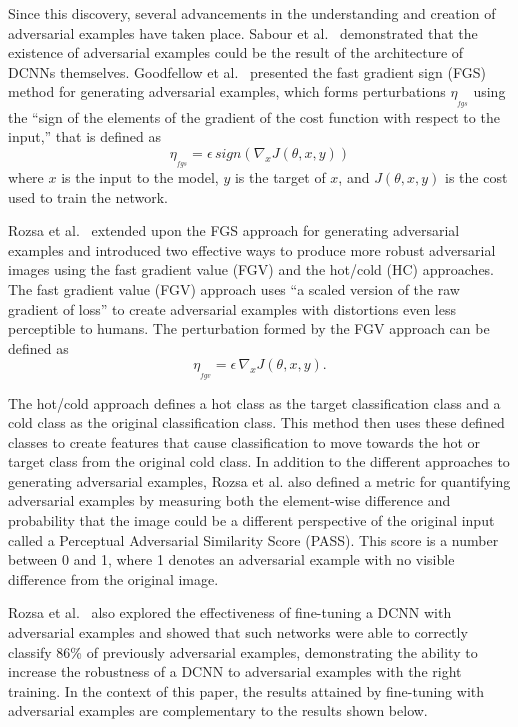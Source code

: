 \documentclass[conference]{IEEEtran}
\begin{document}
Since this discovery, several advancements in the understanding and creation of adversarial examples have taken place. Sabour et al.~\cite{c16} demonstrated that the existence of adversarial examples could be the result of the architecture of DCNNs themselves.  Goodfellow et al.~\cite{c5} presented the fast gradient sign (FGS) method for generating adversarial examples, which forms perturbations $\eta_{_{fgs}}$ using the ``sign of the elements of the gradient of the cost function with respect to the input,'' that is defined as
\begin{equation}
	\label{eq:fgs}
	\eta_{_{fgs}} = \epsilon\,sign(\nabla_xJ(\theta,x,y))
\end{equation}
where \(x\) is the input to the model, \(y\) is the target of \(x\), and \(J(\theta,x,y)\) is the cost used to train the network.\par

Rozsa et al.~\cite{c1} extended upon the FGS approach for generating adversarial examples and introduced two effective ways to produce more robust adversarial images using the fast gradient value (FGV) and the hot/cold (HC) approaches. The fast gradient value (FGV) approach uses ``a scaled version of the raw gradient of loss'' to create adversarial examples with distortions even less perceptible to humans.  The perturbation formed by the FGV approach can be defined as
\begin{equation}
	\label{eq:fgv}
	\eta_{_{fgv}}= \epsilon\,\nabla_xJ(\theta,x,y).
\end{equation}


The hot/cold approach defines a hot class as the target classification class and a cold class as the original classification class.  This method then uses these defined classes to create features that cause classification to move towards the hot or target class from the original cold class.  In addition to the different approaches to generating adversarial examples, Rozsa et al. also defined a metric for quantifying adversarial examples by measuring both the element-wise difference and probability that the image could be a different perspective of the original input called a Perceptual Adversarial Similarity Score (PASS).  This score is a number between 0 and 1, where 1 denotes an adversarial example with no visible difference from the original image.\par 
Rozsa et al.~\cite{c1} also explored the effectiveness of fine-tuning a DCNN with adversarial examples and showed that such networks were able to correctly classify 86\% of previously adversarial examples, demonstrating the ability to increase the robustness of a DCNN to adversarial examples with the right training.  In the context of this paper, the results attained by fine-tuning with adversarial examples are complementary to the results shown below.
\end{document}
